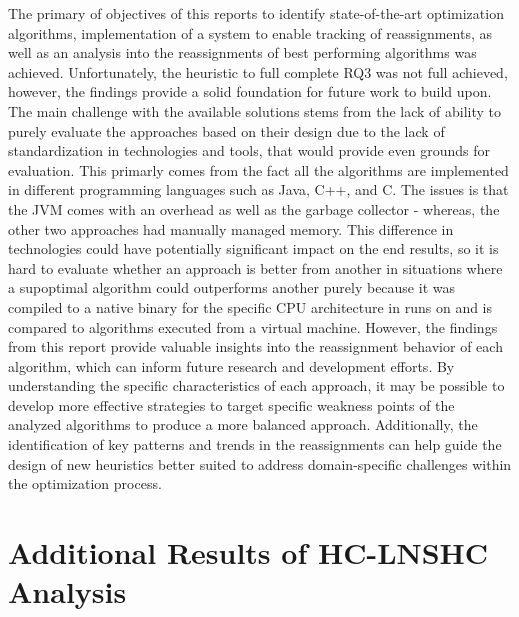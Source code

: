 \documentclass[a4paper,12pt]{Classes/RoboticsLaTeX}
\begin{document}
The primary of objectives of this reports to identify state-of-the-art optimization algorithms, implementation of a system to enable tracking of reassignments, as well as an analysis into the reassignments of best performing algorithms was achieved. Unfortunately, the heuristic to full complete RQ3 was not full achieved, however, the findings provide a solid foundation for future work to build upon.
The main challenge with the available solutions stems from the lack of
ability to purely evaluate the approaches based on their design due to the lack of standardization in technologies and tools, that would provide even grounds for evaluation. This primarly comes from the fact all the algorithms are implemented in different programming languages such as Java, C++, and C. 
The issues is that the JVM comes with an overhead as well as the garbage collector - whereas, the other two approaches had manually managed memory. This difference in technologies could have potentially significant impact on the end results, so it is hard to evaluate whether an approach is better from another in situations where a supoptimal algorithm could outperforms another purely because it was compiled to a native binary for the specific CPU architecture in runs on and is compared to algorithms executed from a virtual machine.
However, the findings from this report provide valuable insights into the reassignment behavior of each algorithm, which can inform future research and development efforts.
By understanding the specific characteristics of each approach, it may be possible to develop more effective strategies to target specific weakness points of the analyzed algorithms to produce a more balanced approach. Additionally, the identification of key patterns and trends in the reassignments can help guide the design of new heuristics better suited to address domain-specific challenges within the optimization process.



 
\renewcommand{\bibname}{References}           %


\appendix


\chapter{Additional Results of HC-LNSHC Analysis} \label{chap:appendix_a}
\end{document}
